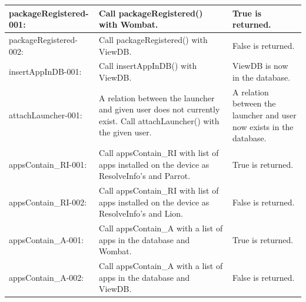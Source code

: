 \begin{table}[ht]
\centering  %
\begin{tabular}{| p{1.7in} | p{1.7in} | p{1.7in} |}
\hline  
packageRegistered-001: & Call packageRegistered() with Wombat. & True is returned. \\ \hline 
packageRegistered-002: & Call packageRegistered() with ViewDB. & False is returned. \\ \hline 
insertAppInDB-001: & Call insertAppInDB() with ViewDB. & ViewDB is now in the database. \\ \hline 
attachLauncher-001: & A relation between the launcher and given user does not currently exist. Call attachLauncher() with the given user. & A relation between the launcher and user now exists in the database. \\ \hline 
appsContain\_{}RI-001: & Call appsContain\_{}RI with list of apps installed on the device as ResolveInfo's and Parrot. & True is returned. \\ \hline 
appsContain\_{}RI-002: & Call appsContain\_{}RI with list of apps installed on the device as ResolveInfo's and Lion. & False is returned. \\ \hline 
appsContain\_{}A-001: & Call appsContain\_{}A with a list of apps in the database and Wombat. & True is returned. \\ \hline 
appsContain\_{}A-002: & Call appsContain\_{}A with a list of apps in the database and ViewDB. & False is returned. \\ [1ex] 
\hline %
\end{tabular}
\end{table}

